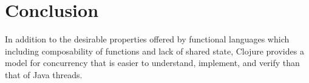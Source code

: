 \section{Conclusion}
In addition to the desirable properties offered by functional languages which including composability of functions and lack of shared state, Clojure provides a model for concurrency that is easier to understand, implement, and verify than that of Java threads.  
